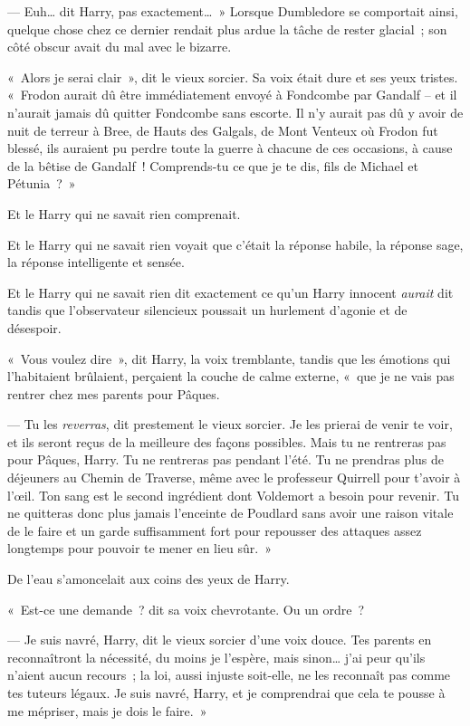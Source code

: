 --- Euh… dit Harry, pas exactement…~» Lorsque Dumbledore se comportait ainsi, quelque chose chez ce dernier rendait plus ardue la tâche de rester glacial~; son côté obscur avait du mal avec le bizarre.

«~Alors je serai clair~», dit le vieux sorcier. Sa voix était dure et ses yeux tristes. «~Frodon aurait dû être immédiatement envoyé à Fondcombe par Gandalf -- et il n'aurait jamais dû quitter Fondcombe sans escorte. Il n'y aurait pas dû y avoir de nuit de terreur à Bree, de Hauts des Galgals, de Mont Venteux où Frodon fut blessé, ils auraient pu perdre toute la guerre à chacune de ces occasions, à cause de la bêtise de Gandalf~! Comprends-tu ce que je te dis, fils de Michael et Pétunia~?~»

Et le Harry qui ne savait rien comprenait.

Et le Harry qui ne savait rien voyait que c'était la réponse habile, la réponse sage, la réponse intelligente et sensée.

Et le Harry qui ne savait rien dit exactement ce qu'un Harry innocent \emph{aurait} dit tandis que l'observateur silencieux poussait un hurlement d'agonie et de désespoir.

«~Vous voulez dire~», dit Harry, la voix tremblante, tandis que les émotions qui l'habitaient brûlaient, perçaient la couche de calme externe, «~que je ne vais pas rentrer chez mes parents pour Pâques.

--- Tu les \emph{reverras}, dit prestement le vieux sorcier. Je les prierai de venir te voir, et ils seront reçus de la meilleure des façons possibles. Mais tu ne rentreras pas pour Pâques, Harry. Tu ne rentreras pas pendant l'été. Tu ne prendras plus de déjeuners au Chemin de Traverse, même avec le professeur Quirrell pour t'avoir à l'œil. Ton sang est le second ingrédient dont Voldemort a besoin pour revenir. Tu ne quitteras donc plus jamais l'enceinte de Poudlard sans avoir une raison vitale de le faire et un garde suffisamment fort pour repousser des attaques assez longtemps pour pouvoir te mener en lieu sûr.~»

De l'eau s'amoncelait aux coins des yeux de Harry.

«~Est-ce une demande~? dit sa voix chevrotante. Ou un ordre~?

--- Je suis navré, Harry, dit le vieux sorcier d'une voix douce. Tes parents en reconnaîtront la nécessité, du moins je l'espère, mais sinon… j'ai peur qu'ils n'aient aucun recours~; la loi, aussi injuste soit-elle, ne les reconnaît pas comme tes tuteurs légaux. Je suis navré, Harry, et je comprendrai que cela te pousse à me mépriser, mais je dois le faire.~»

